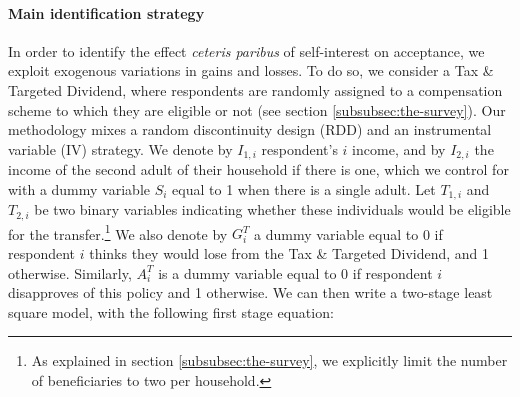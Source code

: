 \documentclass[12pt]{article} %
\begin{document}

\paragraph{Main identification strategy}

In order to identify the effect \textit{ceteris paribus} of self-interest on acceptance, we exploit exogenous variations in gains and losses. To do so, we consider a Tax \& Targeted Dividend, where respondents are randomly assigned to a compensation scheme to which they are eligible or not (see section \ref{subsubsec:the-survey}). Our methodology mixes a random discontinuity design (RDD) and an instrumental variable (IV) strategy. We denote by $I_{1,i}$ respondent's $i$ income, and by $I_{2,i}$ the income of the second adult of their household if there is one, which we control for with a dummy variable $S_i$ equal to 1 when there is a single adult. Let $T_{1,i}$ and $T_{2,i}$ be two binary variables indicating whether these individuals would be eligible for the transfer.\footnote{As explained in section \ref{subsubsec:the-survey}, we explicitly limit the number of beneficiaries to two per household.} We also denote by $G_i^T$ a dummy variable equal to 0 if respondent $i$ thinks they would lose from the Tax \& Targeted Dividend, and 1 otherwise. Similarly, $A_i^T$ is a dummy variable equal to 0 if respondent $i$ disapproves of this policy and 1 otherwise. We can then write a two-stage least square model, with the following first stage equation:


\end{document}
